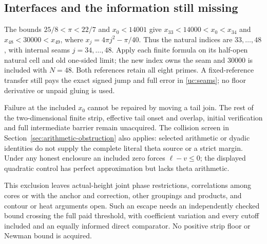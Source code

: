 \subsection{Interfaces and the information still missing}

The bounds $25/8<\pi<22/7$ and $x_0<14001$ give
$x_{33}<14000<x_0<x_{34}$ and $x_{48}<30000<x_{49}$, where
$x_j=4\pi j^2-\pi/40$. Thus the natural indices are $33,\ldots,48$,
with internal seams $j=34,\ldots,48$. Apply each finite formula on
its half-open natural cell and old one-sided limit; the new index owns
the seam and $30000$ is included with $N=48$. Both references retain
all eight primes. A fixed-reference transfer still pays the exact
signed jump and full error in \eqref{uc:seams}; no floor derivative
or unpaid gluing is used.

Failure at the included $x_0$ cannot be repaired by moving a tail join.
The rest of the two-dimensional finite strip, effective tail onset and
overlap, initial verification and full intermediate barrier remain
unacquired. The collision screen in Section~\ref{sec:arithmetic-obstruction}
also applies: selected arithmetic or dyadic identities do not supply the
complete literal theta source or a strict margin. Under any honest
enclosure an included zero forces $\ell-v\le0$; the displayed quadratic
control has perfect approximation but lacks theta arithmetic.

This exclusion leaves actual-height joint phase restrictions, correlations
among cores or with the anchor and correction, other groupings and
products, and contour or heat arguments open. Such an escape needs an
independently checked bound crossing the full paid threshold, with
coefficient variation and every cutoff included and an equally informed
direct comparator. No positive strip floor or Newman bound is acquired.
